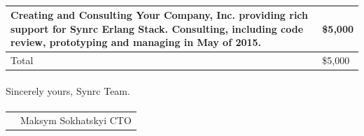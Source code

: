 \documentclass[11pt,oneside]{article}
\begin{document}
\vspace{3\baselineskip}
\paragraph{}
\noindent

\begin{tabular}{ | p{14cm} | l |}
\hline
Creating and Consulting {\bf Your Company, Inc.}
providing rich support for Synrc Erlang Stack.
Consulting, including code review, prototyping
and managing in May of 2015. & \$5,000 \\
\hline
Total & \$5,000 \\
\hline
\end{tabular}

\vspace{3\baselineskip}
\paragraph{}
Sincerely yours, Synrc Team.
\paragraph{}
\vspace{3\baselineskip}
\begin{tabular}{ll}
    & Maksym Sokhatskyi CTO \\
\end{tabular}
\end{document}
